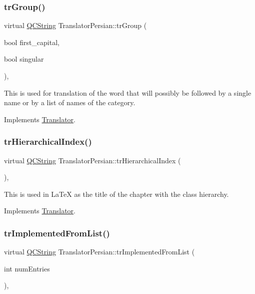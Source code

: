 \subsubsection{\texorpdfstring{trGroup()}{trGroup()}}
{\footnotesize\ttfamily virtual \mbox{\hyperlink{class_q_c_string}{Q\+C\+String}} Translator\+Persian\+::tr\+Group (\begin{DoxyParamCaption}\item[{bool}]{first\+\_\+capital,  }\item[{bool}]{singular }\end{DoxyParamCaption})\hspace{0.3cm}{\ttfamily [inline]}, {\ttfamily [virtual]}}

This is used for translation of the word that will possibly be followed by a single name or by a list of names of the category. 

Implements \mbox{\hyperlink{class_translator}{Translator}}.

\mbox{\label{class_translator_persian_aef46d497bcbc6c64f9c056c2330cfd72}} 
\subsubsection{\texorpdfstring{trHierarchicalIndex()}{trHierarchicalIndex()}}
{\footnotesize\ttfamily virtual \mbox{\hyperlink{class_q_c_string}{Q\+C\+String}} Translator\+Persian\+::tr\+Hierarchical\+Index (\begin{DoxyParamCaption}{ }\end{DoxyParamCaption})\hspace{0.3cm}{\ttfamily [inline]}, {\ttfamily [virtual]}}

This is used in La\+TeX as the title of the chapter with the class hierarchy. 

Implements \mbox{\hyperlink{class_translator}{Translator}}.

\mbox{\label{class_translator_persian_a854a097b43de9a54c7fdaf50c94bc4b2}} 
\subsubsection{\texorpdfstring{trImplementedFromList()}{trImplementedFromList()}}
{\footnotesize\ttfamily virtual \mbox{\hyperlink{class_q_c_string}{Q\+C\+String}} Translator\+Persian\+::tr\+Implemented\+From\+List (\begin{DoxyParamCaption}\item[{int}]{num\+Entries }\end{DoxyParamCaption})\hspace{0.3cm}{\ttfamily [inline]}, {\ttfamily [virtual]}}

